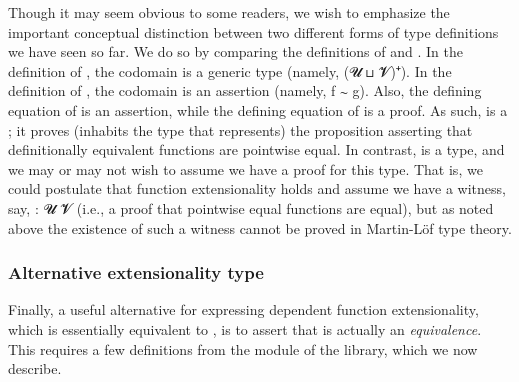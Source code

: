 Though it may seem obvious to some readers, we wish to emphasize the important conceptual distinction between two different forms of type definitions we have seen so far.  We do so by comparing the definitions of  and .  In the definition of , the codomain is a generic type (namely, (\ab 𝓤 \ap ⊔ \ab 𝓥)\af ⁺\af ̇). In the definition of , the codomain is an assertion (namely, \ab f \af ∼ \ab g).  Also, the defining equation of  is an assertion, while the defining equation of  is a proof.  As such,  is a ; it proves (inhabits the type that represents) the proposition asserting that definitionally equivalent functions are pointwise equal. In contrast,  is a type, and we may or may not wish to assume we have a proof for this type. That is, we could postulate that function extensionality holds and assume we have a witness, say,  \as :  \ab 𝓤 \ab 𝓥 (i.e., a proof that pointwise equal functions are equal), but as noted above the existence of such a witness cannot be proved in Martin-Löf type theory.

\subsubsection{Alternative extensionality type}\label{alternative-extensionality-type}

Finally, a useful alternative for expressing dependent function extensionality, which is essentially equivalent to , is to assert that  is actually an \emph{equivalence}. This requires a few definitions from the  module of the \typetopology library, which we now describe.

